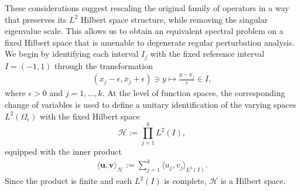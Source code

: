 \documentclass[preprint,12pt]{elsarticle}
\newcommand{\R}{\mathbb R}
\newcommand{\fvect}[1]{\mathbf{#1}}
\begin{document}


These considerations suggest rescaling the original family of operators in a way that preserves its $L^2$ Hilbert space structure,
while removing the singular eigenvalue scale. This allows us to obtain an equivalent spectral problem on a fixed Hilbert space that is amenable to degenerate regular perturbation analysis.\\

We begin by identifying each interval $I_j$ with the fixed reference
interval $I=(-1,1)$ through the transformation
\begin{align}\label{rescale_pert_frac_Lap_Dir}
(x_j-\epsilon,x_j+\epsilon)\ni y
\longmapsto
\frac{y-x_j}{\epsilon}\in I,
\end{align}
where $\epsilon>0$ and $j=1,\ldots,k$. At the level of function
spaces, the corresponding change of variables is used to define a unitary
identification of the varying spaces $L^2(\Omega_\epsilon)$ with the
fixed Hilbert space
\[
\mathcal H:=\prod_{j=1}^kL^2(I),
\]
equipped with the inner product
\begin{align}\label{prod_sp_IP}
\langle \fvect{u},\fvect{v}\rangle_{\mathcal H}
:=
\sum_{j=1}^k
\langle u_j,v_j\rangle_{L^2(I)}.
\end{align}
Since the product is finite and each $L^2(I)$ is complete,
$\mathcal H$ is a Hilbert space. 
\end{document}
